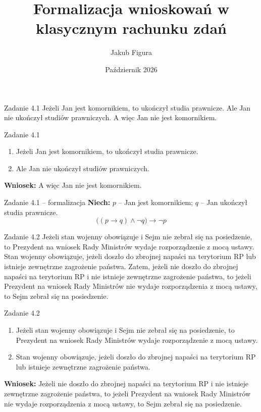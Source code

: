 \documentclass[12pt]{beamer}
\title[Formalizacja]{Formalizacja wnioskowań w klasycznym rachunku zdań}
\author{Jakub Figura}
\date{Październik 2026}
\begin{document}
\begin{frame}
\titlepage
\end{frame}

\begin{frame}{Zadanie 4.1}
Jeżeli Jan jest komornikiem, to ukończył studia prawnicze. Ale Jan nie ukończył studiów prawniczych. A więc Jan nie jest komornikiem.
\end{frame}

\begin{frame}{Zadanie 4.1}
\begin{enumerate}
    \item[P1.] Jeżeli Jan jest komornikiem, to ukończył studia prawnicze.
    \item[P2.] Ale Jan nie ukończył studiów prawniczych.
\end{enumerate}
\vspace{6pt}
\textbf{Wniosek:} A więc Jan nie jest komornikiem.
\end{frame}

\begin{frame}{Zadanie 4.1 -- formalizacja}
\textbf{Niech:} $p$ -- Jan jest komornikiem; $q$ -- Jan ukończył studia prawnicze.
\vspace{10pt}
\[ \big((p \rightarrow q) \wedge \neg q\big) \rightarrow \neg p \]
\end{frame}

\begin{frame}{Zadanie 4.2}
\footnotesize
Jeżeli stan wojenny obowiązuje i Sejm nie zebrał się na posiedzenie, to Prezydent na wniosek Rady Ministrów wydaje rozporządzenie z mocą ustawy. Stan wojenny obowiązuje, jeżeli doszło do zbrojnej napaści na terytorium RP lub istnieje zewnętrzne zagrożenie państwa. Zatem, jeżeli nie doszło do zbrojnej napaści na terytorium RP i nie istnieje zewnętrzne zagrożenie państwa, to jeżeli Prezydent na wniosek Rady Ministrów nie wydaje rozporządzenia z mocą ustawy, to Sejm zebrał się na posiedzenie.
\end{frame}

\begin{frame}{Zadanie 4.2}
\footnotesize
\begin{enumerate}
    \item[P1.] Jeżeli stan wojenny obowiązuje i Sejm nie zebrał się na posiedzenie, to Prezydent na wniosek Rady Ministrów wydaje rozporządzenie z mocą ustawy.
    \item[P2.] Stan wojenny obowiązuje, jeżeli doszło do zbrojnej napaści na terytorium RP lub istnieje zewnętrzne zagrożenie państwa.
\end{enumerate}
\vspace{6pt}
\textbf{Wniosek:} Jeżeli nie doszło do zbrojnej napaści na terytorium RP i nie istnieje zewnętrzne zagrożenie państwa, to jeżeli Prezydent na wniosek Rady Ministrów nie wydaje rozporządzenia z mocą ustawy, to Sejm zebrał się na posiedzenie.
\end{frame}
\end{document}
